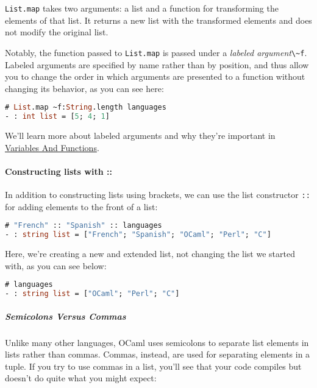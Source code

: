 \passthrough{\lstinline!List.map!} takes two arguments: a list and a
function for transforming the elements of that list. It returns a new
list with the transformed elements and does not modify the original
list.

Notably, the function passed to \passthrough{\lstinline!List.map!} is
passed under a \emph{labeled argument}\passthrough{\lstinline!\~f!}.
Labeled arguments are specified by name rather than by position, and
thus allow you to change the order in which arguments are presented to a
function without changing its behavior, as you can see
here:

\begin{lstlisting}[language=Caml]
# List.map ~f:String.length languages
- : int list = [5; 4; 1]
\end{lstlisting}

We'll learn more about labeled arguments and why they're important in
\href{variables-and-functions.html\#variables-and-functions}{Variables
And Functions}.

\hypertarget{constructing-lists-with}{%
\paragraph{Constructing lists with ::}\label{constructing-lists-with}}

In addition to constructing lists using brackets, we can use the list
constructor \passthrough{\lstinline!::!} for adding elements to the
front of a list:

\begin{lstlisting}[language=Caml]
# "French" :: "Spanish" :: languages
- : string list = ["French"; "Spanish"; "OCaml"; "Perl"; "C"]
\end{lstlisting}

Here, we're creating a new and extended list, not changing the list we
started with, as you can see below:

\begin{lstlisting}[language=Caml]
# languages
- : string list = ["OCaml"; "Perl"; "C"]
\end{lstlisting}

\hypertarget{semicolons-versus-commas}{%
\subparagraph{Semicolons Versus Commas}\label{semicolons-versus-commas}}

Unlike many other languages, OCaml uses semicolons to separate list
elements in lists rather than commas. Commas, instead, are used for
separating elements in a tuple. If you try to use commas in a list,
you'll see that your code compiles but doesn't do quite what you might
expect:

